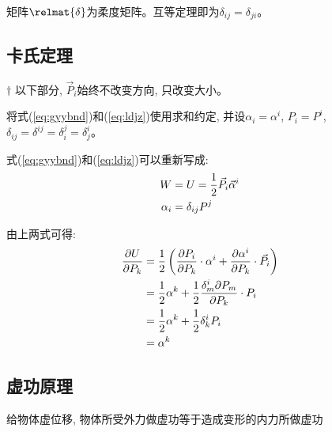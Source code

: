 矩阵$\relmat{\delta}$为柔度矩阵。互等定理即为$\delta_{ij} = \delta_{ji}$。

\subsection{卡氏定理}

$\dagger$ 以下部分, ${\vec P_i}$始终不改变方向, 只改变大小。\par

将式(\ref{eq:gyybnd})和(\ref{eq:ldjz})使用求和约定, 并设${\alpha_i} = {\alpha^i}$, %
${P_i} = {P^i}$, ${\delta_{ij}}={\delta^{ij}}={\delta_i^j}={\delta^i_j}$。\par
式(\ref{eq:gyybnd})和(\ref{eq:ldjz})可以重新写成:
\begin{subequations}
    \begin{align}
        W &= U = {1\over2}{\vec P_i}{\vec\alpha^i}\cr
        {\alpha_i} &= \delta_{ij}{P^j}
    \end{align}
\end{subequations}

由上两式可得:
\begin{align}
    {\partial U\over\partial P_k} &= {1\over2}\left({\partial{P_i}\over{\partial P_k}}\cdot{%
    \alpha^i} + {\partial\alpha^i\over{\partial P_k}}\cdot{\vec P_i}\right)\cr
    & = {1\over2}{\alpha^k} + {1\over2}{\delta_m^i\partial{P_m}\over{\partial P_k}}%
    \cdot{P_i}\cr
    & = {1\over2}{\alpha^k} + {1\over2}{\delta_k^i{P_i}}\cr
    & = {\alpha^k}
\end{align}

\subsection{虚功原理}
\label{subsec:xgyl}


给物体虚位移, 物体所受{\imp 外力做虚功}等于{\imp 造成变形的内力所做虚功}


